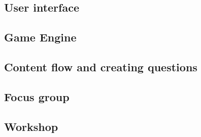  
\subsection{User interface}
\subsection{Game Engine}
\subsection{Content flow and creating questions}



\subsection{Focus group}

\subsection{Workshop}
